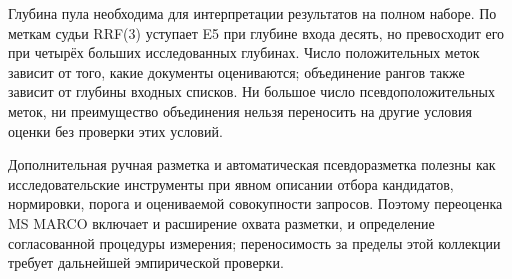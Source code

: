 \documentclass[runningheads,a4paper]{llncs}
\begin{document}
Глубина пула необходима для интерпретации результатов на полном наборе. По меткам судьи RRF(3) уступает E5 при глубине входа десять, но превосходит его при четырёх больших исследованных глубинах. Число положительных меток зависит от того, какие документы оцениваются; объединение рангов также зависит от глубины входных списков. Ни большое число псевдоположительных меток, ни преимущество объединения нельзя переносить на другие условия оценки без проверки этих условий.

Дополнительная ручная разметка и автоматическая псевдоразметка полезны как исследовательские инструменты при явном описании отбора кандидатов, нормировки, порога и оцениваемой совокупности запросов. Поэтому переоценка MS MARCO включает и расширение охвата разметки, и определение согласованной процедуры измерения; переносимость за пределы этой коллекции требует дальнейшей эмпирической проверки.


\clearpage

\end{document}
